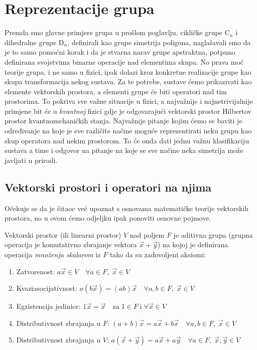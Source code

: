 
\chapter{Reprezentacije grupa}

Premda smo glavne primjere grupa u prošlom poglavlju,
cikličke grupe $\mathrm{C}_n$ i dihedralne grupe $\mathrm{D}_n$,
definirali kao grupe simetrija poligona,
naglašavali smo da je to samo pomoćni korak i da je stvarna
narav grupe apstraktna, potpuno definirana svojstvima binarne
operacije nad elementima skupa.
No prava moć teorije grupa, i ne samo u fizici, ipak dolazi kroz
konkretne realizacije grupe kao skupa transformacija
nekog sustava. Za te potrebe, sustave ćemo
prikazivati kao elemente vektorskih prostora, a elementi
grupe će biti operatori nad tim prostorima.
To pokriva sve važne situacije u fizici, a najvažnije
i najnetrivijalnije primjene bit će u \emph{kvantnoj} fizici gdje
je odgovarajući vektorski prostor Hilbertov prostor kvantnomehaničkih
stanja. Najvažnije pitanje kojim ćemo se baviti je određivanje na koje je
sve različite načine moguće reprezentirati neku grupu kao skup operatora nad
nekim prostorom.
To će onda dati jednu važnu klasifikaciju sustava a time i odgovor na pitanje
na koje se sve načine neka simetrija može javljati u prirodi.



\section{Vektorski prostori i operatori na njima}

Očekuje se da je čitaoc već upoznat s osnovama matematičke
teorije vektorskih prostora, no u ovom ćemo odjeljku ipak ponoviti
osnovne pojmove.

\begin{definicija} 
Vektorski prostor (ili linearni prostor) $V$ nad poljem $F$ je aditivna grupa
(grupna operacija je komutativno zbrajanje vektora $\vec{x}+\vec{y}$) na
kojoj je definirana operacija \emph{množenja skalarom} iz $F$ tako
da su zadovoljeni aksiomi:
\begin{enumerate}
\item Zatvorenost: $a\vec{x}\in V \quad \forall a\in F,\; \vec{x}\in V$
\item Kvaziasocijativnost: $a(b\vec{x})=(ab)\vec{x} \quad
 \forall a,b \in F,\; \vec{x}\in V$
\item Egzistencija jedinice: $ 1\vec{x}=\vec{x} \quad \text{za}\; 1\in F
 \;\text{i}\; \forall \vec{x} \in V $
\item Distributivnost zbrajanja u $F$:
 $(a+b)\vec{x} = a \vec{x} + b \vec{x} \quad \forall a,b \in F,\;\vec{x} \in V$
\item Distributivnost zbrajanja u $V$:
 $a(\vec{x} + \vec{y}) = a \vec{x} + a \vec{y} \quad \forall a \in F,\; 
 \vec{x}, \vec{y} \in V$
\end{enumerate}
\end{definicija}

